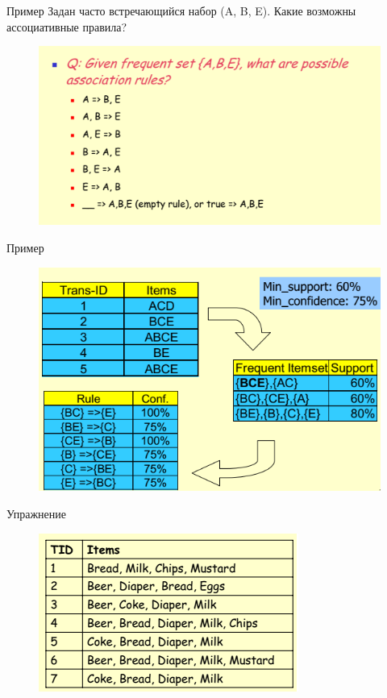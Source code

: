 \documentclass{beamer}
\begin{document}
\begin{frame}{Пример}
Задан часто встречающийся набор (A, B, E). Какие возможны ассоциативные правила?
\begin{figure}[h]
\centering
\includegraphics[scale=0.75]{images/lec08-pic15.png}
\end{figure}
\end{frame}

\begin{frame}{Пример}
\begin{figure}[h]
\centering
\includegraphics[scale=0.75]{images/lec08-pic16.png}
\end{figure}
\end{frame}

\begin{frame}{Упражнение}
\begin{figure}[h]
\centering
\includegraphics[scale=0.75]{images/lec08-pic17.png}
\end{figure}
\end{frame}
\end{document}
